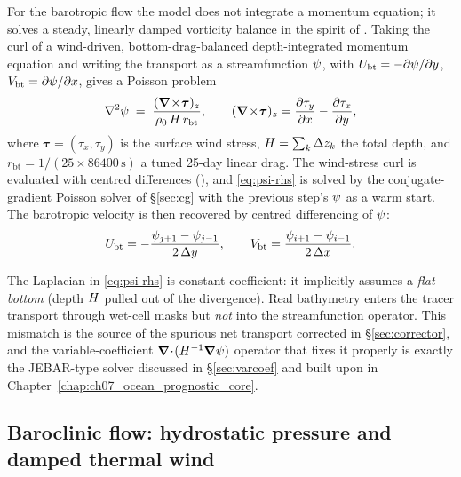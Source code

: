For the barotropic flow the model does not integrate a momentum equation; it solves
a steady, linearly damped vorticity balance in the spirit of \citet{stommel1961}.
Taking the curl of a wind-driven, bottom-drag-balanced depth-integrated momentum
equation and writing the transport as a streamfunction $\psi$, with
$U_{\mathrm{bt}}=-\partial\psi/\partial y$, $V_{\mathrm{bt}}=\partial\psi/\partial x$,
gives a Poisson problem
\begin{equation}
  \nabla^{2}\psi \;=\; \frac{(\boldsymbol{\nabla}\!\times\!\boldsymbol{\tau})_z}{\rho_0\,H\,r_{\mathrm{bt}}},
  \qquad
  (\boldsymbol{\nabla}\!\times\!\boldsymbol{\tau})_z = \frac{\partial \tau_y}{\partial x} - \frac{\partial \tau_x}{\partial y},
  \label{eq:psi-rhs}
\end{equation}
where $\boldsymbol{\tau}=(\tau_x,\tau_y)$ is the surface wind stress, $H=\sum_k
\Delta z_k$ the total depth, and $r_{\mathrm{bt}}=1/(25\times86400\,\mathrm{s})$ a
tuned 25-day linear drag. The wind-stress curl is evaluated with centred
differences (), and \eqref{eq:psi-rhs} is solved by the
conjugate-gradient Poisson solver of \S\ref{sec:cg} with the previous step's
$\psi$ as a warm start. The barotropic velocity is then recovered by centred
differencing of $\psi$:
\begin{equation}
  U_{\mathrm{bt}} = -\frac{\psi_{j+1}-\psi_{j-1}}{2\,\Delta y},
  \qquad
  V_{\mathrm{bt}} = \frac{\psi_{i+1}-\psi_{i-1}}{2\,\Delta x}.
\end{equation}

\begin{remark}
The Laplacian in \eqref{eq:psi-rhs} is constant-coefficient: it implicitly assumes a
\emph{flat bottom} (depth $H$ pulled out of the divergence). Real bathymetry
enters the tracer transport through wet-cell masks but \emph{not} into the
streamfunction operator. This mismatch is the source of the spurious net transport
corrected in \S\ref{sec:corrector}, and the variable-coefficient
$\boldsymbol{\nabla}\!\cdot\!(H^{-1}\boldsymbol{\nabla}\psi)$ operator that fixes it properly is exactly the
JEBAR-type solver discussed in \S\ref{sec:varcoef} and built upon in
Chapter~\ref{chap:ch07_ocean_prognostic_core}.
\end{remark}

\subsection{Baroclinic flow: hydrostatic pressure and damped thermal wind}


